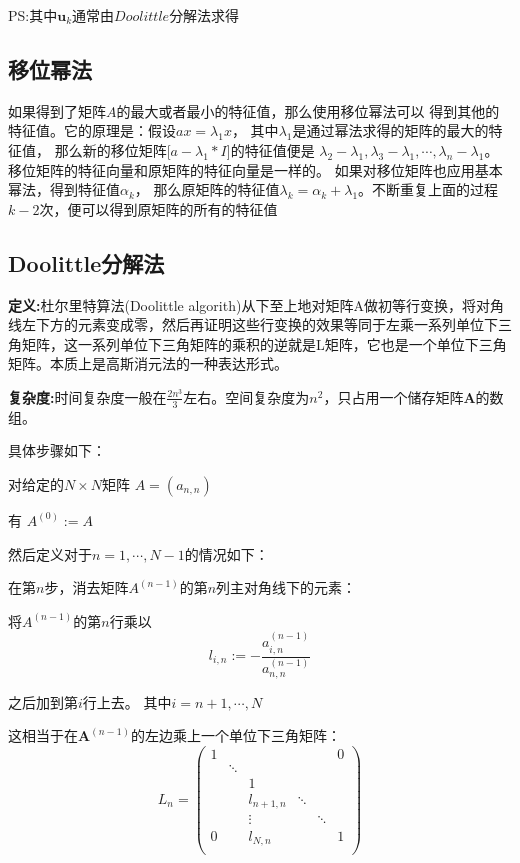 PS:其中$\bm{u}_k$通常由$Doolittle$分解法求得

\subsection{移位幂法}
如果得到了矩阵$A$的最大或者最小的特征值，那么使用移位幂法可以
得到其他的特征值。它的原理是：假设$ax =\lambda_1x$，
其中$\lambda_1$是通过幂法求得的矩阵的最大的特征值，
那么新的移位矩阵[$a−\lambda_1*I$]的特征值便是
$\lambda_2-\lambda_1, \lambda_3-\lambda_1,
\cdots,\lambda_n-\lambda_1$。
移位矩阵的特征向量和原矩阵的特征向量是一样的。
如果对移位矩阵也应用基本幂法，得到特征值$\alpha_k$，
那么原矩阵的特征值$\lambda_k= \alpha_k+\lambda_1$。不断重复上面的过程$k-2$次，便可以得到原矩阵的所有的特征值

\subsection{Doolittle分解法}
\textbf{定义:}杜尔里特算法(Doolittle algorith)从下至上地对矩阵A做初等行变换，将对角线左下方的元素变成零，然后再证明这些行变换的效果等同于左乘一系列单位下三角矩阵，这一系列单位下三角矩阵的乘积的逆就是L矩阵，它也是一个单位下三角矩阵。本质上是高斯消元法的一种表达形式。

\textbf{复杂度:}时间复杂度一般在$\frac{2n^{3}}{3}$左右。空间复杂度为$n^2$，只占用一个储存矩阵$\bm{A}$的数组。

具体步骤如下：

对给定的$N\times N$矩阵
${\displaystyle A=(a_{n,n})}$

有
${\displaystyle A^{(0)}:=A} $

然后定义对于$n = 1,\cdots,N-1$的情况如下：

在第$n$步，消去矩阵$A^{(n-1)}$的第$n$列主对角线下的元素：

将$A^{(n-1)}$的第$n$行乘以
\[{\displaystyle l_{i,n}:=-{\frac {a_{i,n}^{(n-1)}}{a_{n,n}^{(n-1)}}}}\]

之后加到第$i$行上去。
其中${\displaystyle i=n+1,\cdots ,N}$ 

这相当于在$\bm{A}^{(n-1)}$的左边乘上一个单位下三角矩阵：
\[L_{n}={\begin{pmatrix}1&&&&&0\\&\ddots &&&&\\&&1&&&\\&&l_{{n+1,n}}&\ddots &&\\&&\vdots &&\ddots &\\0&&l_{{N,n}}&&&1\\\end{pmatrix}}\]

